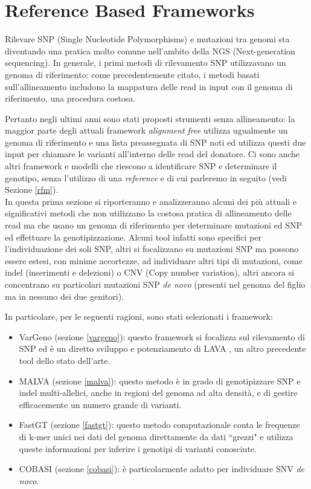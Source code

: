 \documentclass[../main.tex]{subfiles}
\begin{document}
\section{Reference Based Frameworks}
\label{rbm}

Rilevare SNP (Single Nucleotide Polymorphisms) e mutazioni tra genomi sta diventando una pratica molto comune nell'ambito della NGS (Next-generation sequencing). In generale, i primi metodi di rilevamento SNP utilizzavano un genoma di riferimento: come precedentemente citato, i metodi basati sull'allineamento includono la mappatura delle read in input con il genoma di riferimento, una procedura costosa. 

Pertanto negli ultimi anni sono stati proposti strumenti senza allineamento: la maggior parte degli attuali framework \textit{alignment free} utilizza ugualmente un genoma di riferimento e una lista preassegnata di SNP noti ed utilizza questi due input per chiamare le varianti all'interno delle read del donatore. Ci sono anche altri framework e modelli che riescono a identificare SNP e determinare il genotipo, senza l'utilizzo di una \textit{reference} e di cui parleremo in seguito (vedi Sezione \ref{rfm}). \\

In questa prima sezione si riporteranno e analizzeranno alcuni dei più attuali e significativi metodi che non utilizzano la costosa pratica di allineamento delle read ma che usano un genoma di riferimento per determinare mutazioni ed SNP ed effettuare la genotipizzazione. Alcuni tool infatti sono specifici per l'individuazione dei soli SNP, altri si focalizzano su mutazioni SNP ma possono essere estesi, con minime accortezze, ad individuare altri tipi di mutazioni, come indel (inserimenti e delezioni) o CNV (Copy number variation), altri ancora si concentrano su particolari mutazioni SNP \textit{de novo} (presenti nel genoma del figlio ma in nessuno dei due genitori).

In particolare, per le seguenti ragioni, sono stati selezionati i framework:
\begin{itemize} 
\item VarGeno (sezione \ref{vargeno}): questo framework \cite{sun-medvedev2018vargeno} si focalizza sul rilevamento di SNP ed è un diretto sviluppo e potenziamento di LAVA \cite{shajii2016lava}, un altro precedente tool dello stato dell'arte.
\item MALVA (sezione \ref{malva}): questo metodo \cite{bernardini2019malva} è in grado di genotipizzare SNP e indel multi-allelici, anche in regioni del genoma ad alta densità, e di gestire efficacemente un numero grande di varianti.
\item FastGT (sezione \ref{fastgt}): questo metodo computazionale \cite{pajuste2017fastgt} conta le frequenze di k-mer unici nei dati del genoma direttamente da dati ``grezzi" e utilizza queste informazioni per inferire i genotipi di varianti conosciute. 
\item COBASI (sezione \ref{cobasi}): \cite{gomez-romero2018cobasi} è particolarmente adatto per individuare SNV \textit{de novo}. 
\end{itemize} 
\end{document}
